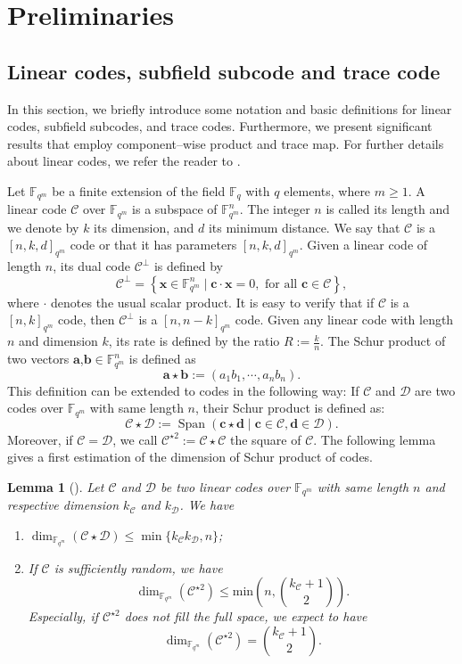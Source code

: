 \documentclass[a4paper]{amsart}
\newtheorem{lemma}[thm]{Lemma}
\theoremstyle{definition}
\theoremstyle{remark}
\newcommand{\calC}{\mathcal{C}}
\newcommand{\calD}{\mathcal{D}}
\newcommand{\fqm}{\mathbb{F}_{q^m}}
\newcommand{\fq}{\mathbb{F}_{q}}
\newcommand{\Span}[1]{\operatorname{Span}\left(#1\right)}
\begin{document}
\section{Preliminaries}\label{sec:preli}
\subsection{Linear codes, subfield subcode and trace code}

In this section, we briefly introduce some notation and basic definitions for linear codes, subfield subcodes, and trace codes. Furthermore, we present significant results that employ component--wise product and trace map. For further details about linear codes, we refer the reader to \cite{MS86}.

\noindent Let $\fqm$ be a finite extension of the field $\fq$ with $q$ elements, where $m \geq 1$. A linear code $\calC$ over $\fqm$ is a subspace of $\fqm^n$. The integer $n$ is called its length and we denote by $k$ its dimension, and $d$ its minimum distance. We say that $\calC$ is a $[n,k,d]_{q^m}$ code or that it has parameters $[n,k,d]_{q^m}$. Given a linear code of length $n$, its dual code $\calC^{\perp}$ is defined by 
\[\calC^{\perp}=\left\lbrace \mathbf{x} \in \fqm^n \mid \mathbf{c} \cdot \mathbf{x}=0, \text{ for all } \mathbf{c} \in \calC \right\rbrace,\]  
where $\cdot$ denotes the usual scalar product. It is easy to verify that if $\calC$ is a $[n,k]_{q^m}$ code, then $\calC^{\perp}$ is a $[n,n-k]_{q^m}$ code.
Given any linear code with length $n$ and dimension $k$, its rate is defined by the ratio $R := \frac{k}{n}$.
The Schur product of two vectors $\mathbf{a}$,$\mathbf{b} \in \fqm^n$ is defined as 
\[ \mathbf{a} \star \mathbf{b} := (a_1b_1,\cdots,a_nb_n). \]
This definition can be extended to codes in the following way: If $\calC$ and $\calD$ are two codes over $\fqm$ with same length $n$, their Schur product is defined as:
\[ \calC \star \calD := \Span{\mathbf{c} \star \mathbf{d} \mid \mathbf{c} \in \calC, \mathbf{d} \in \calD}. \]
Moreover, if $\calC = \calD$, we call $\calC^{\star 2} := \calC \star \calC$ the square of $\calC$. The following lemma gives a first estimation of the dimension of Schur product of codes.

\begin{lemma}[{\cite[Proposition~10]{MT21}}] \label{lem:known_bounds}
Let $\calC$ and $\calD$ be two linear codes over $\fqm$ with same length $n$ and respective dimension $k_{\calC}$ and $k_{\calD}$. We have
\begin{enumerate}
 \item $\dim_{\fqm}(\calC \star \calD) \leq \min\{k_{\calC}k_{\calD},n\}$;
 \item If $\calC$ is sufficiently random, we have
\[ \dim_{\mathbb{F}_{q^m}}(\calC^{\star2}) \leq \mathrm{min}\left(n,\binom{k_{\calC}+1}{2}\right) . \]
Especially, if $\calC^{\star2}$ does not fill the full space, we expect to have 
 \[ \dim_{\fqm}(\calC^{\star2}) = \binom{k_{\calC}+1}{2}.\]
 \end{enumerate}
\end{lemma}
\end{document}

